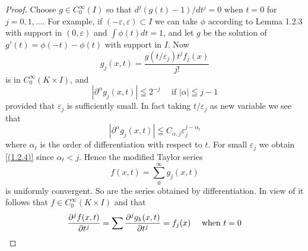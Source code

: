 \begin{proof}
    Choose $g \in C_{0}^{\infty}(I)$ so that $d^{j}(g(t)-1) / d t^{j}=0$ when $t=0$ for $j=0,1, \ldots$. For example, if $(-\varepsilon, \varepsilon) \subset I$ we can take $\phi$ according to Lemma 1.2.3 with support in $(0, \varepsilon)$ and $\int \phi(t) d t=1$, and let $g$ be the solution of $g'(t)=\phi(-t)-\phi(t)$ with support in $I$. Now
\[
	g_{j}(x, t)=\frac{g\left(t / \varepsilon_{j}\right) t^{j} f_{j}(x)}{j !}
\]
is in $C_{0}^{\infty}(K \times I)$, and
\begin{equation}
    \label{(1.2.4)}
	\left|\partial^{\alpha} g_{j}(x, t)\right| \leqq 2^{-j} \quad \text { if }|\alpha| \leqq j-1
\end{equation}
provided that $\varepsilon_{j}$ is sufficiently small. In fact taking $t / \varepsilon_{j}$ as new variable we see that
\[
	\left|\partial^{\alpha} g_{j}(x, t)\right| \leqq C_{\alpha, j} \varepsilon_{j}^{j-\alpha_{t}}
\]
where $\alpha_{t}$ is the order of differentiation with respect to $t$. For small $\varepsilon_{j}$ we obtain \eqref{(1.2.4)} since $\alpha_{t}<j$. Hence the modified Taylor series
\[
	f(x, t)=\sum_{0}^{\infty} g_{j}(x, t)
\]
is uniformly convergent. So are the series obtained by differentiation. In view of  it follows that $f \in C_{0}^{\infty}(K \times I)$ and that
\[
	\frac{\partial^{j} f(x, t)}{\partial t^{j}}=\sum \frac{\partial^{j} g_{k}(x, t)}{\partial t^{j}}=f_{j}(x) \quad \text { when } t=0\qedhere
\]
\end{proof}
